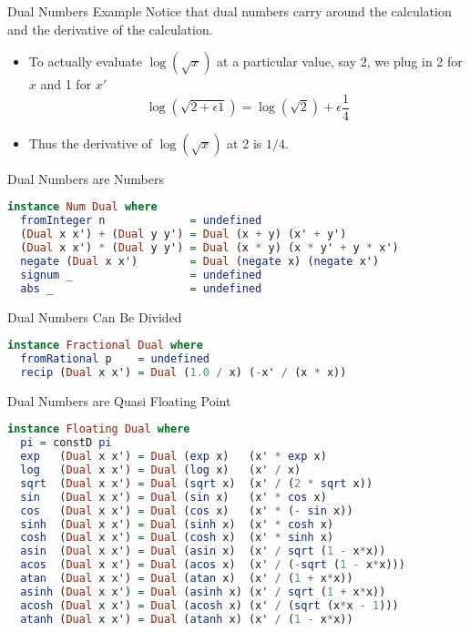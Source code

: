 \documentclass{beamer}
\begin{document}
\begin{frame}[fragile]{Dual Numbers Example}
Notice that dual numbers carry around the calculation and the
derivative of the calculation.

\begin{itemize}
\item
To actually evaluate $\log(\sqrt{x})$
at a particular value, say 2, we plug in 2 for $x$ and 1 for $x'$
$$
\log (\sqrt{2 + \epsilon 1}) = \log(\sqrt{2}) + \epsilon\frac{1}{4}
$$
\item
Thus the derivative of $\log(\sqrt{x})$ at 2 is $1/4$.
\end{itemize}
\end{frame}

\begin{frame}[fragile]{Dual Numbers are Numbers}
\begin{scriptsize}
\begin{lstlisting}[language=Haskell]
instance Num Dual where
  fromInteger n             = undefined
  (Dual x x') + (Dual y y') = Dual (x + y) (x' + y')
  (Dual x x') * (Dual y y') = Dual (x * y) (x * y' + y * x')
  negate (Dual x x')        = Dual (negate x) (negate x')
  signum _                  = undefined
  abs _                     = undefined
\end{lstlisting}
\end{scriptsize}
\end{frame}

\begin{frame}[fragile]{Dual Numbers Can Be Divided}
\begin{scriptsize}
\begin{lstlisting}[language=Haskell]
instance Fractional Dual where
  fromRational p    = undefined
  recip (Dual x x') = Dual (1.0 / x) (-x' / (x * x))
\end{lstlisting}
\end{scriptsize}
\end{frame}

\begin{frame}[fragile]{Dual Numbers are Quasi Floating Point}
\begin{scriptsize}
\begin{lstlisting}[language=Haskell]
instance Floating Dual where
  pi = constD pi
  exp   (Dual x x') = Dual (exp x)   (x' * exp x)
  log   (Dual x x') = Dual (log x)   (x' / x)
  sqrt  (Dual x x') = Dual (sqrt x)  (x' / (2 * sqrt x))
  sin   (Dual x x') = Dual (sin x)   (x' * cos x)
  cos   (Dual x x') = Dual (cos x)   (x' * (- sin x))
  sinh  (Dual x x') = Dual (sinh x)  (x' * cosh x)
  cosh  (Dual x x') = Dual (cosh x)  (x' * sinh x)
  asin  (Dual x x') = Dual (asin x)  (x' / sqrt (1 - x*x))
  acos  (Dual x x') = Dual (acos x)  (x' / (-sqrt (1 - x*x)))
  atan  (Dual x x') = Dual (atan x)  (x' / (1 + x*x))
  asinh (Dual x x') = Dual (asinh x) (x' / sqrt (1 + x*x))
  acosh (Dual x x') = Dual (acosh x) (x' / (sqrt (x*x - 1)))
  atanh (Dual x x') = Dual (atanh x) (x' / (1 - x*x))
\end{lstlisting}
\end{scriptsize}
\end{frame}
\end{document}
